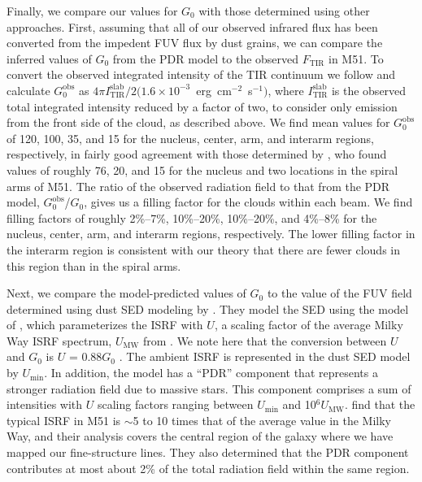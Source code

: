Finally, we compare our values for $G_{0}$ with those determined using other approaches.  First, assuming that all of our observed infrared flux has been converted from the impedent FUV flux by dust grains, we can compare the inferred values of $G_{0}$ from the PDR model to the observed $F_{\mathrm{TIR}}$ in M51.  To convert the observed integrated intensity of the TIR continuum we follow \citet{2005A&A...441..961K} and calculate $G_{0}^{\mathrm{obs}}$ as $4\pi I_{\mathrm{TIR}}^{\mathrm{slab}}/2(1.6 \times 10^{-3}$~erg~cm$^{-2}$~s$^{-1})$, where $I_{\mathrm{TIR}}^{\mathrm{slab}}$ is the observed total integrated intensity reduced by a factor of two, to consider only emission from the front side of the cloud, as described above.  We find mean values for $G_{0}^{\mathrm{obs}}$ of 120, 100, 35, and 15 for the nucleus, center, arm, and interarm regions, respectively, in fairly good agreement with those determined by \citet{2005A&A...441..961K}, who found values of roughly 76, 20, and 15 for the nucleus and two locations in the spiral arms of M51.  The ratio of the observed radiation field to that from the PDR model, $G_{0}^{\mathrm{obs}}$/$G_{0}$, gives us a filling factor for the clouds within each beam.  We find filling factors of roughly 2\%--7\%, 10\%--20\%, 10\%--20\%, and 4\%--8\% for the nucleus, center, arm, and interarm regions, respectively.  The lower filling factor in the interarm region is consistent with our theory that there are fewer clouds in this region than in the spiral arms.

Next, we compare the model-predicted values of $G_{0}$ to the value of the FUV field determined using dust SED modeling by \citet{2012ApJ...755..165M}.  They model the SED using the model of \citet{2007ApJ...657..810D}, which parameterizes the ISRF with $U$, a scaling factor of the average Milky Way ISRF spectrum, $U_{\mathrm{MW}}$ from \citet{1983A&A...128..212M}. We note here that the conversion between $U$ and $G_{0}$ is $U$ = 0.88$G_{0}$ \citep{2007ApJ...663..866D}.  The ambient ISRF is represented in the dust SED model by $U_{\mathrm{min}}$. In addition, the model has a ``PDR'' component that represents a stronger radiation field due to massive stars.  This component comprises a sum of intensities with $U$ scaling factors ranging between $U_{\mathrm{min}}$ and 10$^{6}U_{\mathrm{MW}}$.  \citet{2012ApJ...755..165M} find that the typical ISRF in M51 is $\sim$5 to 10 times that of the average value in the Milky Way, and their analysis covers the central region of the galaxy where we have mapped our fine-structure lines.  They also determined that the PDR component contributes at most about 2\% of the total radiation field within the same region.

